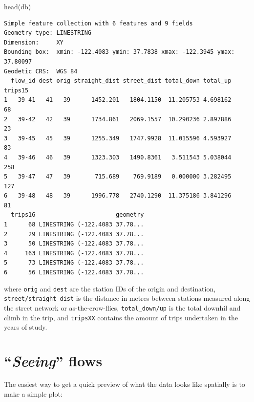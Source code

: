 \documentclass[
  letterpaper,
  DIV=11,
  numbers=noendperiod,
  oneside]{scrreprt}
\newenvironment{Shaded}{\begin{snugshade}}{\end{snugshade}}
\newcommand{\FunctionTok}[1]{\textcolor[rgb]{0.28,0.35,0.67}{#1}}
\newcommand{\NormalTok}[1]{\textcolor[rgb]{0.00,0.23,0.31}{#1}}
\newcommand{\SpecialCharTok}[1]{\textcolor[rgb]{0.37,0.37,0.37}{#1}}
\begin{document}
\begin{Shaded}
\begin{Highlighting}[]
\FunctionTok{head}\NormalTok{(db)}
\end{Highlighting}
\end{Shaded}

\begin{verbatim}
Simple feature collection with 6 features and 9 fields
Geometry type: LINESTRING
Dimension:     XY
Bounding box:  xmin: -122.4083 ymin: 37.7838 xmax: -122.3945 ymax: 37.80097
Geodetic CRS:  WGS 84
  flow_id dest orig straight_dist street_dist total_down total_up trips15
1   39-41   41   39      1452.201   1804.1150  11.205753 4.698162      68
2   39-42   42   39      1734.861   2069.1557  10.290236 2.897886      23
3   39-45   45   39      1255.349   1747.9928  11.015596 4.593927      83
4   39-46   46   39      1323.303   1490.8361   3.511543 5.038044     258
5   39-47   47   39       715.689    769.9189   0.000000 3.282495     127
6   39-48   48   39      1996.778   2740.1290  11.375186 3.841296      81
  trips16                       geometry
1      68 LINESTRING (-122.4083 37.78...
2      29 LINESTRING (-122.4083 37.78...
3      50 LINESTRING (-122.4083 37.78...
4     163 LINESTRING (-122.4083 37.78...
5      73 LINESTRING (-122.4083 37.78...
6      56 LINESTRING (-122.4083 37.78...
\end{verbatim}

where \texttt{orig} and \texttt{dest} are the station IDs of the origin
and destination, \texttt{street/straight\_dist} is the distance in
metres between stations measured along the street network or
as-the-crow-flies, \texttt{total\_down/up} is the total downhil and
climb in the trip, and \texttt{tripsXX} contains the amount of trips
undertaken in the years of study.

\section{\texorpdfstring{``\emph{Seeing}''
flows}{``Seeing'' flows}}\label{seeing-flows}

The easiest way to get a quick preview of what the data looks like
spatially is to make a simple plot:

\begin{Shaded}
\end{Shaded}
\end{document}
